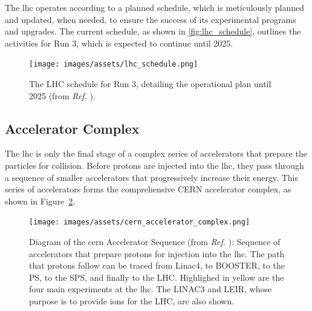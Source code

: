 
The \acrshort{lhc} operates according to a planned schedule, which is meticulously planned and updated, when needed, to ensure the success of its experimental programs and upgrades. The current schedule, as shown in \autoref{fig:lhc_schedule}, outlines the activities for Run 3, which is expected to continue until 2025.


\begin{figure}[!htb]
    \centering
    \texttt{[image: images/assets/lhc\_schedule.png]}
    \caption[LHC Run 3 schedule]{The LHC schedule for Run 3, detailing the operational plan until 2025 (from \textit{Ref.} \cite{LHCSchedule}).}
    \label{fig:lhc_schedule}
\end{figure}

\subsection{Accelerator Complex}
\label{subsec:acc_complex}


The \acrshort{lhc} is only the final stage of a complex series of accelerators that prepare the particles for collision. Before protons are injected into the \acrshort{lhc}, they pass through a sequence of smaller accelerators that progressively increase their energy. This series of accelerators forms the comprehensive CERN accelerator complex, as shown in Figure~\ref{fig:cern_acc_complex}.

\begin{figure}[h]
	\centering
	\texttt{[image: images/assets/cern\_accelerator\_complex.png]}
	\caption[CERN Accelerator Sequence]{Diagram of the \acrshort{cern} Accelerator Sequence (from \textit{Ref.} \cite{cern-accelerator-complex}): Sequence of accelerators that prepare protons for injection into the \acrshort{lhc}. The path that protons follow can be traced from Linac4, to BOOSTER, to the PS, to the SPS, and finally to the LHC. Highlighed in yellow are the four main experiments at the \acrshort{lhc}. The LINAC3 and LEIR, whose purpose is to provide ions for the LHC, are also shown.}
	\label{fig:cern_acc_complex}
\end{figure}

